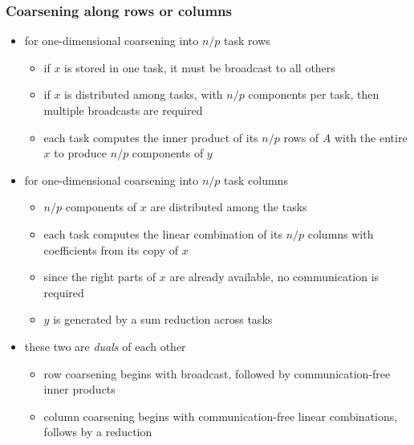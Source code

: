 \begin{frame}[fragile]
%
  \frametitle{Coarsening along rows or columns}
%
  \begin{itemize}
%
  \item for one-dimensional coarsening into $n/p$ task rows
    \begin{itemize}
    \item if $x$ is stored in one task, it must be broadcast to all others
    \item if $x$ is distributed among tasks, with $n/p$ components per task, then multiple
      broadcasts are required
    \item each task computes the inner product of its $n/p$ rows of $A$ with the entire $x$ to
      produce $n/p$ components of $y$
    \end{itemize}
%
  \item for one-dimensional coarsening into $n/p$ task columns
    \begin{itemize}
    \item $n/p$ components of $x$ are distributed among the tasks
    \item each task computes the linear combination of its $n/p$ columns with coefficients
      from its copy of $x$
    \item since the right parts of $x$ are already available, no communication is required
    \item $y$ is generated by a sum reduction across tasks
    \end{itemize}
%
  \item these two are {\em duals} of each other
    \begin{itemize}
    \item row coarsening begins with broadcast, followed by communication-free inner products
    \item column coarsening begins with communication-free linear combinations, follows by a
      reduction
    \end{itemize}
%
  \end{itemize}
%
\end{frame}

